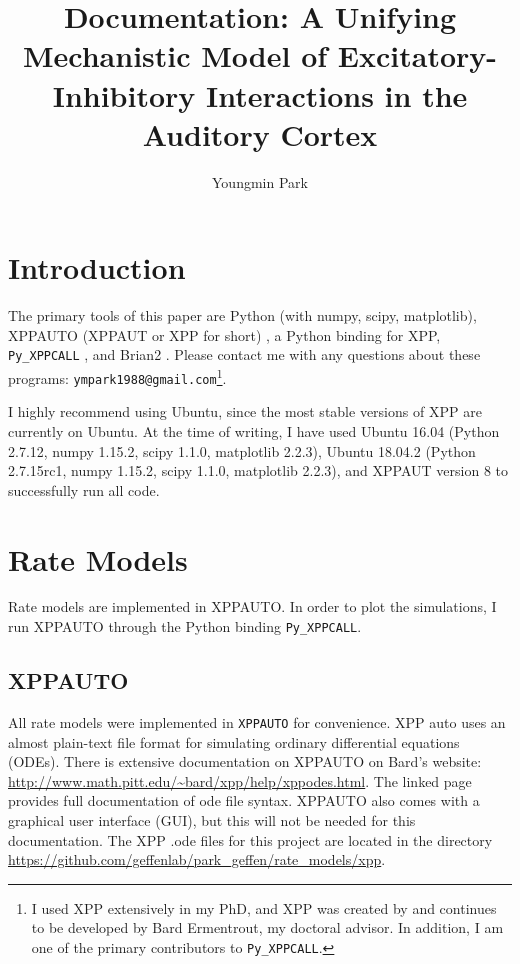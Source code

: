 \documentclass[a4paper,10pt]{article}
\title{Documentation: A Unifying Mechanistic Model of Excitatory-Inhibitory Interactions in the Auditory Cortex}
\author{Youngmin Park}
\newcommand{\y}[1]{{\texttt{#1}}}
\begin{document}
\maketitle



\section{Introduction}
The primary tools of this paper are Python (with numpy, scipy, matplotlib), XPPAUTO (XPPAUT or XPP for short) \cite{ermentrout2002simulating}, a Python binding for XPP, \y{Py\_XPPCALL} \cite{xppy}, and Brian2 \cite{Stimberg595710}. Please contact me with any questions about these programs: \y{ympark1988@gmail.com}\footnote{I used XPP extensively in my PhD, and XPP was created by and continues to be developed by Bard Ermentrout, my doctoral advisor. In addition, I am one of the primary contributors to \y{Py\_XPPCALL}.}.

I highly recommend using Ubuntu, since the most stable versions of XPP are currently on Ubuntu. At the time of writing, I have used Ubuntu 16.04 (Python 2.7.12, numpy 1.15.2, scipy 1.1.0, matplotlib 2.2.3), Ubuntu 18.04.2 (Python 2.7.15rc1, numpy 1.15.2, scipy 1.1.0, matplotlib 2.2.3), and XPPAUT version 8 to successfully run all code.

\section{Rate Models}

Rate models are implemented in XPPAUTO. In order to plot the simulations, I run XPPAUTO through the Python binding \y{Py\_XPPCALL}. 

\subsection{XPPAUTO}
All rate models were implemented in \texttt{XPPAUTO} for convenience. XPP auto uses an almost plain-text file format for simulating ordinary differential equations (ODEs). There is extensive documentation on XPPAUTO on Bard's website:
\url{http://www.math.pitt.edu/~bard/xpp/help/xppodes.html}. The linked page provides full documentation of ode file syntax. XPPAUTO also comes with a graphical user interface (GUI), but this will not be needed for this documentation. The XPP .ode files for this project are located in the directory \url{https://github.com/geffenlab/park_geffen/rate_models/xpp}.
\end{document}
